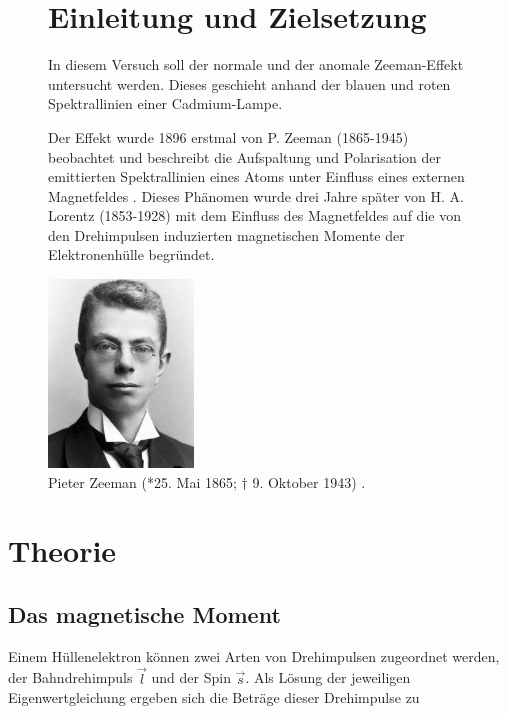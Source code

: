 



\maketitle

\FloatBarrier
\begin{figure}[h]
\begin{minipage}[t]{0.59\textwidth}
\vspace{0pt}
\section{Einleitung und Zielsetzung}
In diesem Versuch soll der normale und der anomale Zeeman-Effekt untersucht werden. Dieses geschieht anhand der blauen und roten Spektrallinien einer Cadmium-Lampe.

Der Effekt wurde 1896 erstmal von P. Zeeman (1865-1945) beobachtet und beschreibt die Aufspaltung und Polarisation der emittierten Spektrallinien eines Atoms
unter Einfluss eines externen Magnetfeldes \cite{quelle03}. Dieses Phänomen wurde drei Jahre später von H. A. Lorentz (1853-1928) mit dem Einfluss des Magnetfeldes auf die
von den Drehimpulsen induzierten magnetischen Momente der Elektronenhülle begründet.
\end{minipage}
\hfill
\begin{minipage}[t]{0.4\textwidth}
\vspace{0pt}
\centering
\includegraphics[height=5.0cm]{sexyTyp.png}
\caption{Pieter Zeeman (*25. Mai 1865; $\dagger$ 9. Oktober 1943) \cite{quelle03}.}
\label{fig:tfig1}
\end{minipage}
\end{figure}
\FloatBarrier

\section{Theorie}
\subsection{Das magnetische Moment}
Einem Hüllenelektron können zwei Arten von Drehimpulsen zugeordnet werden, der Bahndrehimpuls $\vec{l}$ und der Spin $\vec{s}$. Als Lösung der jeweiligen Eigenwertgleichung
ergeben sich die Beträge dieser Drehimpulse zu


